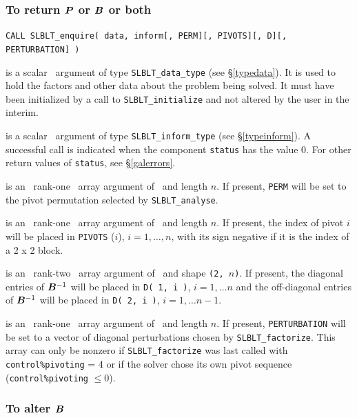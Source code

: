 \documentclass{galahad}
\newcommand{\packagename}{SLBLT}
\begin{document}
\subsubsection{To return ${\bm{P}}$ or ${\bm{B}}$ or both}
\label{galenquire}

\hskip0.5in
{\tt CALL \packagename\_enquire( data, inform[, PERM][, PIVOTS][, D][, PERTURBATION] )}

\begin{description}

 is a scalar \intentinout\ argument of type
{\tt \packagename\_data\_type}
(see \S\ref{typedata}). It is used to hold the factors and other
data about the problem being solved.
It must have been initialized by a call to
{\tt \packagename\_ini\-tialize} and not altered by the user in the interim.

 is a scalar \intentinout\ argument of type
{\tt \packagename\_inform\_type}
(see \S\ref{typeinform}).
A successful call is indicated when the  component {\tt status} has the value 0.
For other return values of {\tt status}, see \S\ref{galerrors}.

 is an \optional\ rank-one \integer\ array argument
of \intentout\ and length $n$.
If present, {\tt PERM} will be set to the pivot permutation
selected by {\tt \packagename\_analyse}.

 is an \optional\ rank-one \integer\ array argument
of \intentout\  and length $n$.
If present, the index of pivot $i$ will be placed in
{\tt PIVOTS} ($i$), $i = 1, \ldots, n$, with its sign negative if it is
the index of a 2 x 2 block.

 is an \optional\ rank-two \realdp\ array argument
of \intentout\, and shape {\tt (2, $n$)}.
If present, the diagonal entries of ${\bm{B}}^{-1} $ will
be placed in {\tt D( 1, i )}, $i = 1, \ldots n$ and the off-diagonal
entries of ${\bm{B}}^{-1} $ will be placed in {\tt D( 2, i )},
$i = 1, \ldots n-1$.

 is an \optional\ rank-one \realdp\ array argument
of \intentout\ and length $n$.
If present, {\tt PERTURBATION} will be set to a vector of diagonal perturbations
chosen by {\tt \packagename\_factorize}. This array can only be nonzero if
{\tt \packagename\_factorize} was last called with {\tt control\%pivoting} = 4
or if the solver chose its own pivot sequence ({\tt control\%pivoting} $\leq 0$).

\end{description}

\subsubsection{To alter ${\bm{B}}$}
\end{document}
